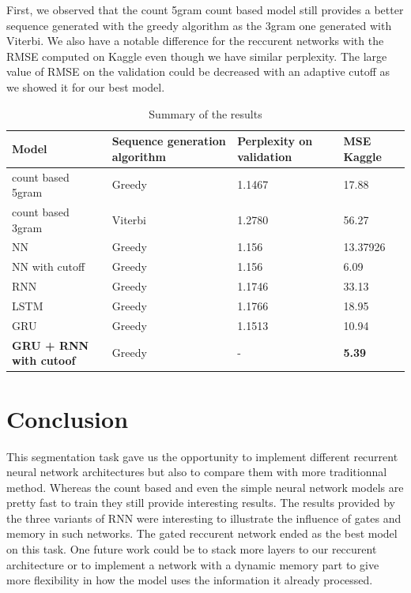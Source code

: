 \documentclass[11pt]{article}
\begin{document}
First, we observed that the count 5gram count based model still provides a better sequence generated with the greedy algorithm as the 3gram one generated with Viterbi.
We also have a notable difference for the reccurent networks with the RMSE computed on Kaggle even though we have similar perplexity. The large value of RMSE on the validation could be decreased with an adaptive cutoff as we showed it for our best model.

\begin{table}[H]
\centering
\caption{Summary of the results}
\begin{tabular}{|l|l|l|l|}
\hline
Model             & Sequence generation algorithm & Perplexity on validation & MSE Kaggle \\ \hline
count based 5gram & Greedy                        & 1.1467                   & 17.88       \\ \hline
count based 3gram & Viterbi                       & 1.2780                   & 56.27       \\ \hline
NN                & Greedy                             & 1.156                        & 13.37926           \\ \hline
NN with cutoff               & Greedy                           &       1.156                  & 6.09           \\ \hline
RNN               & Greedy                        & 1.1746                   & 33.13       \\ \hline
LSTM              & Greedy                        & 1.1766                   & 18.95       \\ \hline
GRU               & Greedy                        & 1.1513                   & 10.94       \\ \hline
\textbf{GRU + RNN with cutoof}           & Greedy                        & -                  & \textbf{5.39}       \\ \hline
\end{tabular}
\end{table}


\section{Conclusion}

This segmentation task gave us the opportunity to implement different recurrent neural network architectures but also to compare them with more traditionnal method. Whereas the count based and even the simple neural network models are pretty fast to train they still provide interesting results. The results provided by the three variants of RNN were interesting to illustrate the influence of gates and memory in such networks. The gated reccurent network ended as the best model on this task. One future work could be to stack more layers to our reccurent architecture or to implement a network with a dynamic memory part to give more flexibility in how the model uses the information it already processed.
\end{document}

